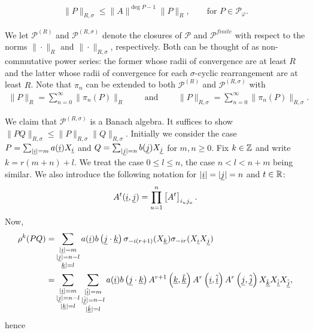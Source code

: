 	\begin{align*}
		\|P\|_{R,\sigma}\leq \|A\|^{\deg{P}-1}\|P\|_R,\qquad \text{for }P\in\mathscr{P}_\varphi.
	\end{align*}
\par
We let $\mathscr{P}^{(R)}$ and $\mathscr{P}^{(R,\sigma)}$ denote the closures of $\mathscr{P}$ and $\mathscr{P}^{finite}$ with respect to the norms $\|\cdot\|_R$ and $\|\cdot\|_{R,\sigma}$, respectively. Both can be thought of as non-commutative power series: the former whose radii of convergence are at least $R$ and the latter whose radii of convergence for each $\sigma$-cyclic rearrangement are at least $R$. Note that $\pi_n$ can be extended to both $\mathscr{P}^{(R)}$ and $\mathscr{P}^{(R,\sigma)}$ with
	\begin{align*}
		\|P\|_R=\sum_{n=0}^\infty \|\pi_n(P)\|_R\qquad\text{ and }\qquad \|P\|_{R,\sigma}=\sum_{n=0}^\infty \|\pi_n(P)\|_{R,\sigma}.
	\end{align*}\par
We claim that $\mathscr{P}^{(R,\sigma)}$ is a Banach algebra. It suffices to show $\|PQ\|_{R,\sigma}\leq \|P\|_{R,\sigma}\|Q\|_{R,\sigma}$. Initially we consider the case $P=\sum_{|\underline{i}|=m}a(\underline{i})X_{\underline{i}}$ and $Q=\sum_{|\underline{j}|=n} b(\underline{j})X_{\underline{j}}$ for $m,n\geq 0$. Fix $k\in\mathbb{Z}$ and write $k=r(m+n)+l$. We treat the case $0\leq l \leq n$, the case $n<l<n+m$ being similar. We also introduce the following notation for $|\underline{i}|=|\underline{j}|=n$ and $t\in\mathbb{R}$:
	\begin{equation*}
		A^t(\underline{i},\underline{j})=\prod_{u=1}^n \left[A^t\right]_{i_u j_u}.
	\end{equation*}
Now,
	\begin{align*}
		\rho^k(PQ)=&\sum_{\substack{|\underline{i}|=m\\ |\underline{j}|=n-l \\ \underline{k}|=l}} a(\underline{i})b\left(\underline{j}\cdot\underline{k}\right)\sigma_{-i(r+1)}(X_{\underline{k}})\sigma_{-ir}(X_{\underline{i}}X_{\underline{j}}) \\
			=& \sum_{\substack{|\underline{i}|=m\\ |\underline{j}|=n-l\\  |\underline{k}|=l}}\sum_{\substack{|\underline{\hat{i}}|=m\\ |\underline{\hat{j}}|=n-l \\ |\underline{\hat{k}}|=l}} a(\underline{i})b\left(\underline{j}\cdot\underline{k}\right) A^{r+1}\left( \underline{k}, \underline{\hat{k}}\right) A^r\left(\underline{i},\underline{\hat{i}}\right)A^r\left(\underline{j},\underline{\hat{j}}\right) X_{\underline{\hat{k}}}X_{\underline{\hat{i}}} X_{\underline{\hat{j}}},
	\end{align*}
hence
